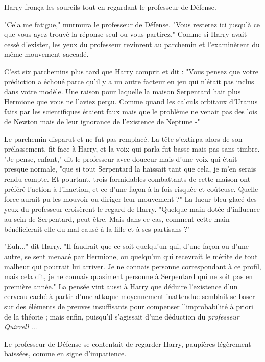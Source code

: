 Harry fronça les sourcils tout en regardant le professeur de Défense.

"Cela me fatigue," murmura le professeur de Défense. "Vous resterez ici jusqu'à ce que vous ayez trouvé la réponse seul ou vous partirez." Comme si Harry avait cessé d'exister, les yeux du professeur revinrent au parchemin et l'examinèrent du même mouvement saccadé.

C'est six parchemins plus tard que Harry comprit et dit : "Vous pensez que votre prédiction a échoué parce qu'il y a un autre facteur en jeu qui n'était pas inclus dans votre modèle. Une raison pour laquelle la maison Serpentard hait plus Hermione que vous ne l'aviez perçu. Comme quand les calculs orbitaux d'Uranus faits par les scientifiques étaient faux mais que le problème ne venait pas des lois de Newton mais de leur ignorance de l'existence de Neptune -"

Le parchemin disparut et ne fut pas remplacé. La tête s'extirpa alors de son prélassement, fit face à Harry, et la voix qui parla fut basse mais pas sans timbre. "Je pense, enfant," dit le professeur avec douceur mais d'une voix qui était presque normale, "que si tout Serpentard la haïssait tant que cela, je m'en serais rendu compte. Et pourtant, trois formidables combattants de cette maison ont préféré l'action à l'inaction, et ce d'une façon à la fois risquée et coûteuse. Quelle force aurait pu les mouvoir ou diriger leur mouvement ?" La lueur bleu glacé des yeux du professeur croisèrent le regard de Harry. "Quelque main dotée d'influence au sein de Serpentard, peut-être. Mais dans ce cas, comment cette main bénéficierait-elle du mal causé à la fille et à ses partisans ?"

"Euh..." dit Harry. "Il faudrait que ce soit quelqu'un qui, d'une façon ou d'une autre, se sent menacé par Hermione, ou quelqu'un qui recevrait le mérite de tout malheur qui pourrait lui arriver. Je ne connais personne correspondant à ce profil, mais cela dit, je ne connais quasiment personne à Serpentard qui ne soit pas en première année." La pensée vint aussi à Harry que déduire l'existence d'un cerveau caché à partir d'une attaque moyennement inattendue semblait se baser sur des éléments de preuves insuffisants pour compenser l'improbabilité à priori de la théorie ; mais enfin, puisqu'il s'agissait d'une déduction du \emph{professeur Quirrell} ...

Le professeur de Défense se contentait de regarder Harry, paupières légèrement baissées, comme en signe d'impatience.


